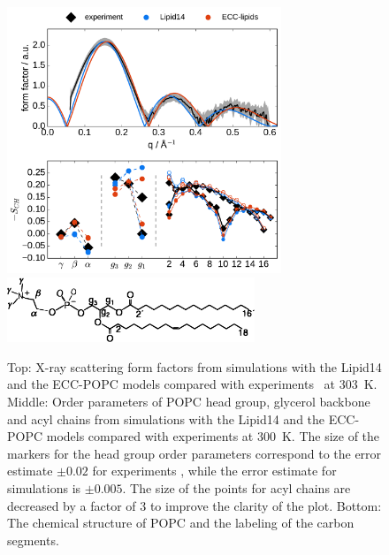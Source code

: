 \documentclass[aip,jcp,twocolumn]{revtex4}
\begin{document}
\begin{figure}[tb!]
  \centering
  \includegraphics[width=8.2cm]{../Fig/ipython_nb/Order-parameters_form-factors_exp-L14-ECCL17_q80_sig89.pdf}
  \includegraphics[width=7.4cm]{../Fig/POPCstructure.eps}
  \caption{\label{simVSexpNOions}
    Top: X-ray scattering form factors from simulations with the Lipid14 \cite{dickson14} and
    the ECC-POPC models compared with experiments~\cite{kucerka11} at 303~K.
    Middle: Order parameters of POPC head group, glycerol backbone and acyl chains 
    from simulations with the Lipid14 \cite{dickson14} and the ECC-POPC models
    compared with experiments \cite{ferreira13} at 300~K.
    The size of the markers for the head group order parameters correspond to
    the error estimate $\pm 0.02$ for experiments \cite{botan15,ollila16},
    while the error estimate for simulations is $\pm 0.005$.
    The size of the points for acyl chains are decreased by a factor of 3 to improve the clarity of the plot.
    Bottom: The chemical structure of POPC and the labeling of the carbon segments.
  } 
\end{figure}
\end{document}
